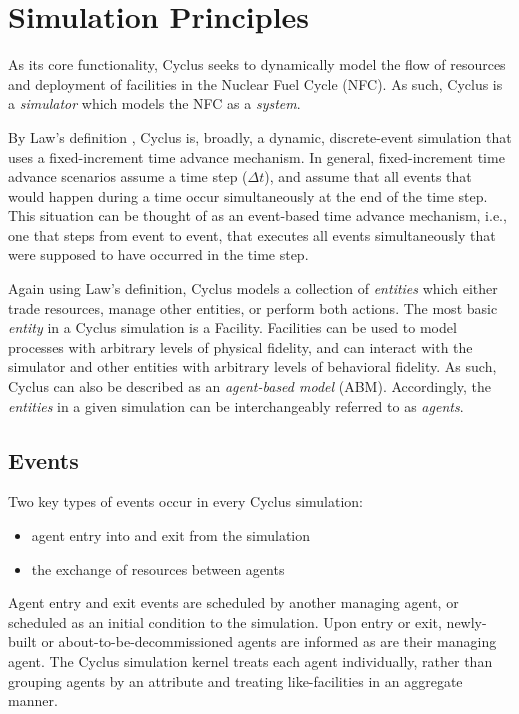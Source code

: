 
\section{Simulation Principles}\label{abm:sim}

As its core functionality, Cyclus seeks to dynamically model the flow of
resources and deployment of facilities in the Nuclear Fuel Cycle (NFC). As such,
Cyclus is a \textit{simulator} which models the NFC as a \textit{system}.

By Law's definition \cite{Law:1999:SMA:554952}, Cyclus is, broadly, a dynamic,
discrete-event simulation that uses a fixed-increment time advance mechanism. In
general, fixed-increment time advance scenarios assume a time step ($\Delta t$),
and assume that all events that would happen during a time occur simultaneously
at the end of the time step. This situation can be thought of as an event-based
time advance mechanism, i.e., one that steps from event to event, that executes
all events simultaneously that were supposed to have occurred in the time step.

Again using Law's definition, Cyclus models a collection of \textit{entities}
which either trade resources, manage other entities, or perform both
actions. The most basic \textit{entity} in a Cyclus simulation is a
Facility. Facilities can be used to model processes with arbitrary levels of
physical fidelity, and can interact with the simulator and other entities with
arbitrary levels of behavioral fidelity. As such, Cyclus can also be described
as an \textit{agent-based model} (ABM). Accordingly, the \textit{entities} in a
given simulation can be interchangeably referred to as \textit{agents}.

\subsection{Events}

Two key types of events occur in every Cyclus simulation:

\begin{itemize}
\item agent entry into and exit from the simulation
\item the exchange of resources between agents
\end{itemize}

Agent entry and exit events are scheduled by another managing agent, or
scheduled as an initial condition to the simulation. Upon entry or exit,
newly-built or about-to-be-decommissioned agents are informed as are their
managing agent. The Cyclus simulation kernel treats each agent individually,
rather than grouping agents by an attribute and treating like-facilities in an
aggregate manner.

